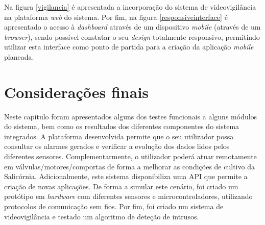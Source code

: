 Na figura \ref{vigilancia} é apresentada a incorporação do sistema de videovigilância na plataforma \textit{web} do sistema. Por fim, na figura \ref{responsiveinterface} é apresentado o acesso à \textit{dashboard} através de um dispositivo \textit{mobile} (através de um \textit{browser}), sendo possível constatar o seu \textit{design} totalmente responsivo, permitindo utilizar esta interface como ponto de partida para a criação da aplicação \textit{mobile} planeada. 




\section{Considerações finais}



Neste capítulo foram apresentados alguns dos testes funcionais a alguns módulos do sistema, bem como os resultados dos diferentes componentes do sistema integrados.  A plataforma desenvolvida permite que o seu utilizador possa consultar os alarmes gerados e verificar a evolução dos dados lidos pelos diferentes sensores. Complementarmente, o utilizador poderá atuar remotamente em válvulas/motores/comportas de forma a melhorar as condições de cultivo da Salicórnia. Adicionalmente, este sistema disponibiliza uma API que permite a criação de novas aplicações. De forma a simular este cenário, foi criado um protótipo em \textit{hardware} com diferentes sensores e microcontroladores, utilizando protocolos de comunicação sem fios. Por fim, foi criado um sistema de videovigilância e testado um algoritmo de deteção de intrusos. 


